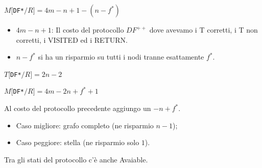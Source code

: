 \begin{center}
    $M[$\texttt{DF*}$/R] = 4m - n + 1 - (n - f^*)$
\end{center}

\begin{itemize}
    \item $ 4m - n + 1$: Il costo del protocollo $DF^{++}$ dove avevamo i T
          corretti, i T non corretti, i VISITED ed i RETURN.
    \item $n-f^*$ si ha un risparmio su tutti i nodi tranne esattamente $f^*$.
\end{itemize}
\begin{center}
    $T[$\texttt{DF*}$/R] = 2n - 2$
\end{center}
\begin{center}
    $M[$\texttt{DF*}$/R] = 4m - 2n + f^* + 1$
\end{center}
Al costo del protocollo precedente aggiungo un $-n+f^*$.
\begin{itemize}
    \item Caso migliore: grafo completo (ne risparmio $n-1$);
    \item Caso peggiore: stella (ne risparmio solo $1$).
\end{itemize}
Tra gli stati del protocollo c'è anche Avaiable.

